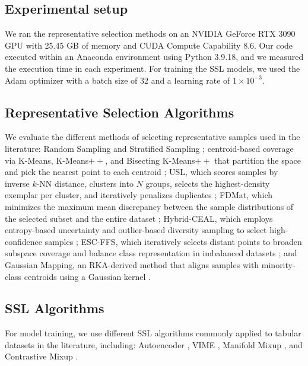 \documentclass[preprint,12pt]{elsarticle}
\begin{document}
\subsection{Experimental setup}

We ran the representative selection methods on an NVIDIA GeForce RTX 3090 GPU with 25.45 GB of memory and CUDA Compute Capability 8.6. Our code executed within an Anaconda environment using Python 3.9.18, and we measured the execution time in each experiment. For training the SSL models, we used the Adam optimizer with a batch size of 32 and a learning rate of $1\times10^{-3}$.

\subsection{Representative Selection Algorithms}

We evaluate the different methods of selecting representative samples used in the literature: Random Sampling and Stratified Sampling \cite{wang2022unsupervised}; centroid-based coverage via K-Means, K-Means$++$, and Bisecting K-Means$++$ that partition the space and pick the nearest point to each centroid \cite{roy2024impact}; USL, which scores samples by inverse $k$-NN distance, clusters into $N$ groups, selects the highest-density exemplar per cluster, and iteratively penalizes duplicates \cite{wang2022unsupervised}; FDMat, which minimizes the maximum mean discrepancy between the sample distributions of the selected subset and the entire dataset \cite{xiao2024feature}; Hybrid-CEAL, which employs entropy-based uncertainty and outlier-based diversity sampling to select high-confidence samples \cite{shankaranarayana2024hybrid}; ESC-FFS, which iteratively selects distant points to broaden subspace coverage and balance class representation in imbalanced datasets \cite{you2020self}; and Gaussian Mapping, an RKA-derived method that aligns samples with minority-class centroids using a Gaussian kernel \cite{li2025kernel}.


\subsection{SSL Algorithms} \label{subsec:algo}

For model training, we use different SSL algorithms commonly applied to tabular datasets in the literature, including: Autoencoder \cite{vincent2008extracting}, VIME \cite{yoon2020vime}, Manifold Mixup \cite{verma2019manifold}, and Contrastive Mixup \cite{darabi2021contrastive}.
\end{document}
